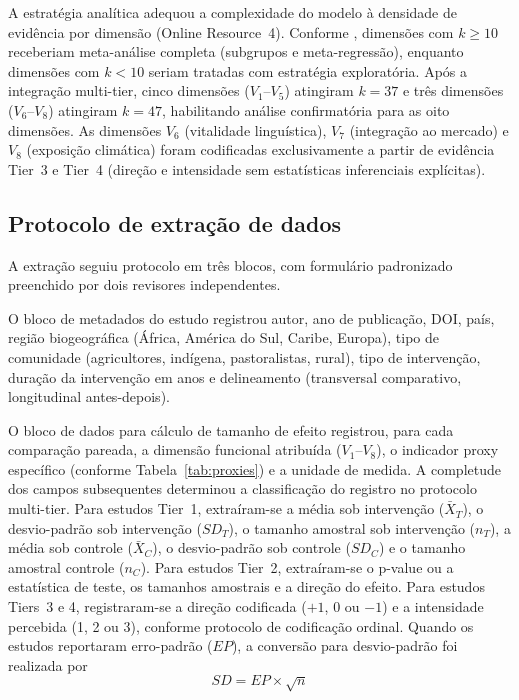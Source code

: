 \documentclass[12pt,a4paper]{article}
\begin{document}
A estratégia analítica adequou a complexidade do modelo à densidade de evidência por dimensão (Online Resource~4). Conforme \citet{Borenstein2009}, dimensões com $k \geq 10$ receberiam meta-análise completa (subgrupos e meta-regressão), enquanto dimensões com $k < 10$ seriam tratadas com estratégia exploratória. Após a integração multi-tier, cinco dimensões ($V_1$--$V_5$) atingiram $k = 37$ e três dimensões ($V_6$--$V_8$) atingiram $k = 47$, habilitando análise confirmatória para as oito dimensões. As dimensões $V_6$ (vitalidade linguística), $V_7$ (integração ao mercado) e $V_8$ (exposição climática) foram codificadas exclusivamente a partir de evidência Tier~3 e Tier~4 (direção e intensidade sem estatísticas inferenciais explícitas).

\subsection{Protocolo de extração de dados}
\label{sec:extraction}

A extração seguiu protocolo em três blocos, com formulário padronizado preenchido por dois revisores independentes.

O bloco de metadados do estudo registrou autor, ano de publicação, DOI, país, região biogeográfica (África, América do Sul, Caribe, Europa), tipo de comunidade (agricultores, indígena, pastoralistas, rural), tipo de intervenção, duração da intervenção em anos e delineamento (transversal comparativo, longitudinal antes-depois).

O bloco de dados para cálculo de tamanho de efeito registrou, para cada comparação pareada, a dimensão funcional atribuída ($V_1$--$V_8$), o indicador proxy específico (conforme Tabela~\ref{tab:proxies}) e a unidade de medida. A completude dos campos subsequentes determinou a classificação do registro no protocolo multi-tier. Para estudos Tier~1, extraíram-se a média sob intervenção ($\bar{X}_T$), o desvio-padrão sob intervenção ($SD_T$), o tamanho amostral sob intervenção ($n_T$), a média sob controle ($\bar{X}_C$), o desvio-padrão sob controle ($SD_C$) e o tamanho amostral controle ($n_C$). Para estudos Tier~2, extraíram-se o p-value ou a estatística de teste, os tamanhos amostrais e a direção do efeito. Para estudos Tiers~3 e 4, registraram-se a direção codificada ($+1$, $0$ ou $-1$) e a intensidade percebida (1, 2 ou 3), conforme protocolo de codificação ordinal. Quando os estudos reportaram erro-padrão ($EP$), a conversão para desvio-padrão foi realizada por
%
\begin{equation}
SD = EP \times \sqrt{n}
\label{eq:sd-ep}
\end{equation}
\end{document}
